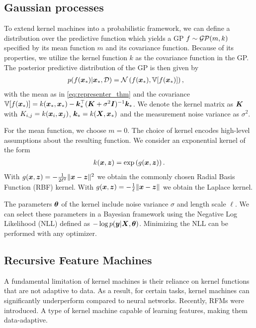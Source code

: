 \subsection{Gaussian processes}
To extend kernel machines into a probabilistic framework, we can define a distribution over the predictive function which yields a GP $f \sim {\mathcal{G}}{\mathcal{P}}(m,k)$ specified by its mean function $m$ and its covariance function. Because of its properties, we utilize the kernel function $k$ as the covariance function in the GP. The posterior predictive distribution of the GP is then given by
\begin{align}
    p(f({\bm{x}}_\ast)|{\bm{x}}_\ast,{\mathcal{D}}) &= {\mathcal{N}} \left( f({\bm{x}}_\ast) , \mathbb{V}[f({\bm{x}}_\ast)] \right),
    \label{eq:gp-predictive-distribution}
\end{align}
with the mean as in \cref{eq:representer_thm} and the covariance $\mathbb{V}[f({\bm{x}}_\ast)]=k({\bm{x}}_\ast,{\bm{x}}_\ast)-{\bm{k}}_\ast^\top({\bm{K}}+\sigma^2{\bm{I}})^{-1}{\bm{k}}_\ast$. We denote the kernel matrix as ${\bm{K}}$ with $K_{i,j}=k({\bm{x}}_i,{\bm{x}}_j)$, ${\bm{k}}_\ast=k({\bm{X}},{\bm{x}}_\ast)$ and the measurement noise variance as $\sigma^2$.

For the mean function, we choose $m=0$.
The choice of kernel encodes high-level assumptions about the resulting function. We consider an exponential kernel of the form
\begin{align}
    k({\bm{x}},{\bm{z}}) = \exp\left( g({\bm{x}}, {\bm{z}}) \right).
\end{align}
With $g({\bm{x}},{\bm{z}})=-\frac{1}{2\ell^2}\|{\bm{x}}-{\bm{z}}\|^2$ we obtain the commonly chosen Radial Basis Function (RBF) kernel. With $g({\bm{x}},{\bm{z}})=-\frac{1}{\ell}\|{\bm{x}}-{\bm{z}}\|$ we obtain the Laplace kernel.

The parameters ${\bm{\theta}}$ of the kernel include noise variance $\sigma$ and length scale $\ell$. We can select these parameters in a Bayesian framework using the Negative Log Likelihood (NLL) defined as $-\log p({\bm{y}}|{\bm{X}},{\bm{\theta}})$. Minimizing the NLL can be performed with any optimizer.








\subsection{Recursive Feature Machines}

A fundamental limitation of kernel machines is their reliance on kernel functions that are not adaptive to data. As a result, for certain tasks, kernel machines can significantly underperform compared to neural networks. Recently, RFMs were introduced. A type of kernel machine capable of learning features, making them data-adaptive.

